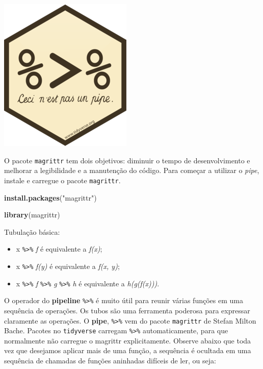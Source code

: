 \documentclass[a4paper]{book}
\newenvironment{Shaded}{\begin{snugshade}}{\end{snugshade}}
\newcommand{\KeywordTok}[1]{\textcolor[rgb]{0.13,0.29,0.53}{\textbf{#1}}}
\newcommand{\NormalTok}[1]{#1}
\newcommand{\StringTok}[1]{\textcolor[rgb]{0.31,0.60,0.02}{#1}}
\providecommand{\tightlist}{%
  \setlength{\itemsep}{0pt}\setlength{\parskip}{0pt}}
\begin{document}
\begin{center}\includegraphics[width=0.25\linewidth]{imagens/magritt} \end{center}

O pacote \texttt{magrittr} tem dois objetivos: diminuir o tempo de desenvolvimento e melhorar a legibilidade e a manutenção do código. Para começar a utilizar o \emph{pipe}, instale e carregue o pacote \texttt{magrittr}.

\begin{Shaded}
\begin{Highlighting}[]
\KeywordTok{install.packages}\NormalTok{(}\StringTok{"magrittr"}\NormalTok{)}
\end{Highlighting}
\end{Shaded}

\begin{Shaded}
\begin{Highlighting}[]
\KeywordTok{library}\NormalTok{(magrittr)}
\end{Highlighting}
\end{Shaded}

Tubulação básica:

\begin{itemize}
\tightlist
\item
  x \texttt{\%\textgreater{}\%} \emph{f} é equivalente a \emph{f(x)};
\item
  x \texttt{\%\textgreater{}\%} \emph{f(y)} é equivalente a \emph{f(x, y)};
\item
  x \texttt{\%\textgreater{}\%} \emph{f} \texttt{\%\textgreater{}\%} \emph{g} \texttt{\%\textgreater{}\%} \emph{h} é equivalente a \emph{h(g(f(x)))}.
\end{itemize}

O operador do \textbf{pipeline} \texttt{\%\textgreater{}\%} é muito útil para reunir várias funções em uma sequência de operações. Os tubos são uma ferramenta poderosa para expressar claramente as operações. O \textbf{pipe}, \texttt{\%\textgreater{}\%} vem do pacote \texttt{magrittr} de Stefan Milton Bache. Pacotes no \texttt{tidyverse} carregam \texttt{\%\textgreater{}\%} automaticamente, para que normalmente não carregue o magrittr explicitamente. Observe abaixo que toda vez que desejamos aplicar mais de uma função, a sequência é ocultada em uma sequência de chamadas de funções aninhadas difíceis de ler, ou seja:
\end{document}
